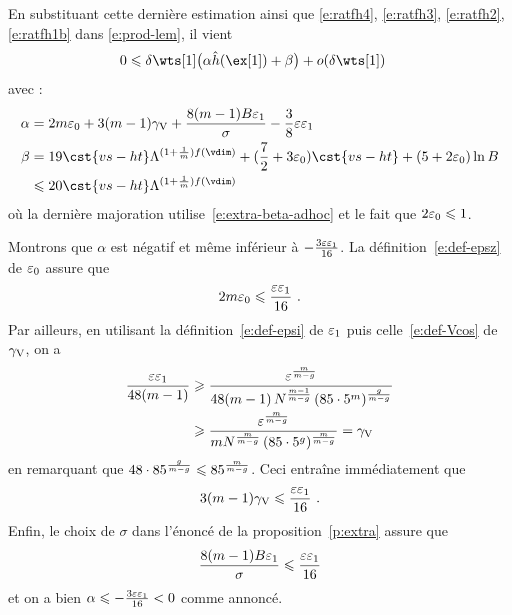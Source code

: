 En substituant cette dernière estimation ainsi que \eqref{e:ratfh4},
\eqref{e:ratfh3}, \eqref{e:ratfh2}, \eqref{e:ratfh1b} dans \eqref{e:prod-lem},
il vient
\begin{align} \label{e:prod-lem-final}
  0
  & \le
  \delta \wts[1] \bigl(
    \alpha \hautn{\ex[1]} + \beta
  \bigr) + o(\delta \wts[1])
\end{align}
avec : %
\begin{align}
  \alpha
  & =
  2 \puiss \epsz
  + 3 (\puiss - 1) \Vcos
  + \frac{8 (\puiss - 1) B \epsi}{\sigma}
  - \frac38 \expapx \epsi
  \\
  \beta
  & =
  19 \cst{vs-ht} \Lambda^{(1 + \frac1\puiss) f(\vdim)}
  + (\frac72 + 3\epsz) \cst{vs-ht} + (5 + 2\epsz) \ln B
  \\ & \le
  20 \cst{vs-ht} \Lambda^{(1 + \frac1\puiss) f(\vdim)}
\end{align}
où la dernière majoration utilise~\eqref{e:extra-beta-adhoc} et le fait que \(
  2 \varepsilon\sb0 \leqslant 1 \).

Montrons que \( \alpha \) est négatif et même
inférieur à \( - \frac{3\varepsilon \varepsilon\sb1}{16} \). La définition~\eqref{e:def-epsz}
de \( \varepsilon\sb0 \) assure que
\begin{equation} \label{e:epsz-ct-extra}
  2 m \varepsilon\sb0
  \leqslant \frac{\varepsilon \varepsilon\sb1}{16}
  \text{ .}
\end{equation}
Par ailleurs, en utilisant la définition~\eqref{e:def-epsi} de \( \varepsilon\sb1 \)
puis celle~\eqref{e:def-Vcos} de \( \gamma \sb{\mathrm{V}} \), on a
\begin{align} \label{e:Vcos-ct-details}
  \frac{ \varepsilon \varepsilon\sb1 }{ 48 (m - 1) }
  & \geqslant
  \frac{
    \varepsilon^{ \frac{m}{m-g} }
  }{
    48 (m - 1)
    \, N^{ \frac{m-1}{m-g} }
    \, (85 \cdot 5^m)^{ \frac{g}{m-g} }
  }
  \\ & \geqslant
  \frac{
    \varepsilon^{ \frac{m}{m-g} }
  }{
    m
    N^{ \frac{m}{m-g} }
    \, (85 \cdot 5^g)^{ \frac{m}{m-g} }
  }
  =
  \gamma \sb{\mathrm{V}}
\end{align}
en remarquant que \( 48 \cdot 85^{ \frac{g}{m-g} } \leqslant 85^{
    \frac{m}{m-g} } \). Ceci entraîne immédiatement que
\begin{equation} \label{e:Vcos-ct-extra}
  3 (m-1) \gamma \sb{\mathrm{V}}
  \leqslant \frac{\varepsilon \varepsilon\sb1}{16}
  \text{ .}
\end{equation}
Enfin, le choix de \( \sigma \) dans l'énoncé de la proposition~\vref{p:extra}
assure que
\begin{equation} \label{e:ct-sigma}
  \frac{8 (m - 1) B \varepsilon\sb1}{\sigma}
  \leqslant \frac{\varepsilon \varepsilon\sb1}{16}
\end{equation}
et on a bien \( \alpha \leqslant - \frac{3\varepsilon \varepsilon\sb1}{16} < 0 \) comme annoncé.

